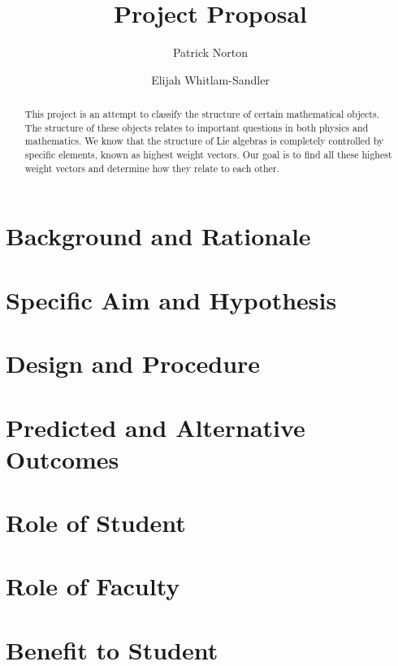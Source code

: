

\usepackage{biblatex}
\usepackage{microtype}


\title{Project Proposal}
\author{Patrick Norton \and Elijah Whitlam-Sandler}



\maketitle

\begin{abstract}
  This project is an attempt to classify the structure of certain mathematical
  objects. %
  The structure of these objects relates to important questions in both
  physics and mathematics. %
  We know that the structure of Lie algebras is completely controlled by
  specific elements, known as highest weight vectors. Our goal is to find all
  these highest weight vectors and determine how they relate to each other.
\end{abstract}

\section{Background and Rationale}


\section{Specific Aim and Hypothesis}


\section{Design and Procedure}

\section{Predicted and Alternative Outcomes}

\section{Role of Student}

\section{Role of Faculty}

\section{Benefit to Student}


\printbibliography{}



